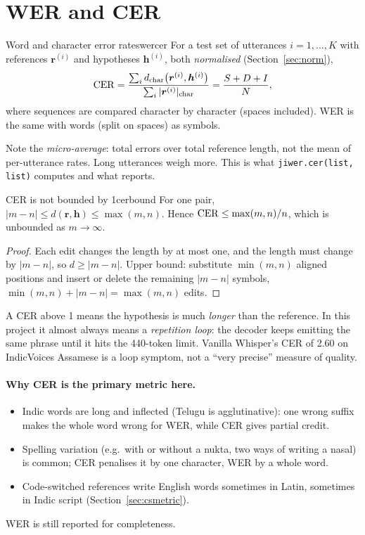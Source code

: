 \section{WER and CER}

\begin{definition}{Word and character error rates}{wercer}
For a test set of utterances $i=1,\dots,K$ with references $\bm r^{(i)}$ and hypotheses $\bm h^{(i)}$, both \emph{normalised}
(Section~\ref{sec:norm}),
\[
\operatorname{CER}=\frac{\sum_{i} d_{\text{char}}\big(\bm r^{(i)},\bm h^{(i)}\big)}{\sum_i |\bm r^{(i)}|_{\text{char}}}
=\frac{S+D+I}{N},
\]
where sequences are compared character by character (spaces included). WER is the same with words (split on spaces) as symbols.
\end{definition}

Note the \emph{micro-average}: total errors over total reference length, not the mean of per-utterance rates. Long utterances weigh
more. This is what \texttt{jiwer.cer(list, list)} computes and what  reports.

\begin{proposition}{CER is not bounded by 1}{cerbound}
For one pair, $|m-n|\le d(\bm r,\bm h)\le\max(m,n)$. Hence $\operatorname{CER}\le\max(m,n)/n$, which is unbounded as $m\to\infty$.
\end{proposition}
\begin{proof}
Each edit changes the length by at most one, and the length must change by $|m-n|$, so $d\ge|m-n|$. Upper bound: substitute
$\min(m,n)$ aligned positions and insert or delete the remaining $|m-n|$ symbols, $\min(m,n)+|m-n|=\max(m,n)$ edits.
\end{proof}

\begin{intuition}
A CER above 1 means the hypothesis is much \emph{longer} than the reference. In this project it almost always means a
\emph{repetition loop}: the decoder keeps emitting the same phrase until it hits the 440-token limit. Vanilla Whisper's CER of
2.60 on IndicVoices Assamese is a loop symptom, not a ``very precise'' measure of quality.
\end{intuition}

\paragraph{Why CER is the primary metric here.}
\begin{itemize}
\item Indic words are long and inflected (Telugu is agglutinative): one wrong suffix makes the whole word wrong for WER, while CER
gives partial credit.
\item Spelling variation (e.g.\ with or without a nukta, two ways of writing a nasal) is common; CER penalises it by one character,
WER by a whole word.
\item Code-switched references write English words sometimes in Latin, sometimes in Indic script (Section~\ref{sec:csmetric}).
\end{itemize}
WER is still reported for completeness.

